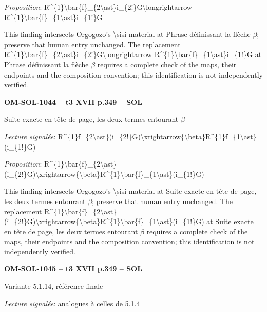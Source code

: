 \emph{Proposition}: R\textasciicircum{}\{1\}\textbackslash{}bar\{f\}\_\{2\textbackslash{}ast\}i\_\{2!\}G\textbackslash{}longrightarrow R\textasciicircum{}\{1\}\textbackslash{}bar\{f\}\_\{1\textbackslash{}ast\}i\_\{1!\}G\par
This finding intersects Orgogozo's \textbackslash{}sisi material at Phrase définissant la flèche \ensuremath{\beta}; preserve that human entry unchanged. The replacement R\textasciicircum{}\{1\}\textbackslash{}bar\{f\}\_\{2\textbackslash{}ast\}i\_\{2!\}G\textbackslash{}longrightarrow R\textasciicircum{}\{1\}\textbackslash{}bar\{f\}\_\{1\textbackslash{}ast\}i\_\{1!\}G at Phrase définissant la flèche \ensuremath{\beta} requires a complete check of the maps, their endpoints and the composition convention; this identification is not independently verified.\par
\par\noindent\textbf{OM-SOL-1044 -- t3 XVII p.349 -- SOL}\par
Suite exacte en tête de page, les deux termes entourant \ensuremath{\beta}\par
\emph{Lecture signalée}: R\textasciicircum{}\{1\}f\_\{2\textbackslash{}ast\}(i\_\{2!\}G)\textbackslash{}xrightarrow\{\textbackslash{}beta\}R\textasciicircum{}\{1\}f\_\{1\textbackslash{}ast\}(i\_\{1!\}G)\par
\emph{Proposition}: R\textasciicircum{}\{1\}\textbackslash{}bar\{f\}\_\{2\textbackslash{}ast\}(i\_\{2!\}G)\textbackslash{}xrightarrow\{\textbackslash{}beta\}R\textasciicircum{}\{1\}\textbackslash{}bar\{f\}\_\{1\textbackslash{}ast\}(i\_\{1!\}G)\par
This finding intersects Orgogozo's \textbackslash{}sisi material at Suite exacte en tête de page, les deux termes entourant \ensuremath{\beta}; preserve that human entry unchanged. The replacement R\textasciicircum{}\{1\}\textbackslash{}bar\{f\}\_\{2\textbackslash{}ast\}(i\_\{2!\}G)\textbackslash{}xrightarrow\{\textbackslash{}beta\}R\textasciicircum{}\{1\}\textbackslash{}bar\{f\}\_\{1\textbackslash{}ast\}(i\_\{1!\}G) at Suite exacte en tête de page, les deux termes entourant \ensuremath{\beta} requires a complete check of the maps, their endpoints and the composition convention; this identification is not independently verified.\par
\par\noindent\textbf{OM-SOL-1045 -- t3 XVII p.349 -- SOL}\par
Variante 5.1.14, référence finale\par
\emph{Lecture signalée}: analogues à celles de 5.1.4\par
